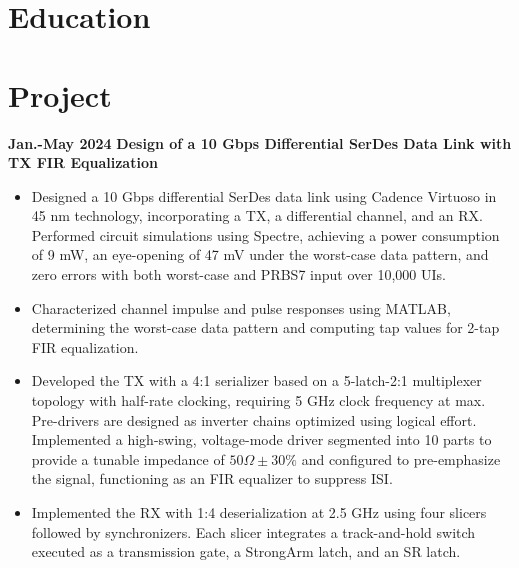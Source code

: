\documentclass[11pt,a4paper,sans]{moderncv}
\begin{document}
\makecvtitle
\vspace{-1.5cm} 

\section{Education}

\vspace{-0.5cm} 
\section{Project}

\cventry
{\textnormal{\textbf{Jan.-May 2024}}}
{\textnormal{\textbf{Design of a 10 Gbps Differential SerDes Data Link with TX FIR Equalization}}}
{}{}{}
{
    \begin{itemize}
        \item Designed a 10 Gbps differential SerDes data link using Cadence Virtuoso in 45 nm technology, incorporating a TX, a differential channel, and an RX. Performed circuit simulations using Spectre, achieving a power consumption of 9 mW, an eye-opening of 47 mV under the worst-case data pattern, and zero errors with both worst-case and PRBS7 input over 10,000 UIs.
        \item Characterized channel impulse and pulse responses using MATLAB, determining the worst-case data pattern and computing tap values for 2-tap FIR equalization.
        \item Developed the TX with a 4:1 serializer based on a 5-latch-2:1 multiplexer topology with half-rate clocking, requiring 5 GHz clock frequency at max. Pre-drivers are designed as inverter chains optimized using logical effort. Implemented a high-swing, voltage-mode driver segmented into 10 parts to provide a tunable impedance of $50 \Omega \pm 30\%$ and configured to pre-emphasize the signal, functioning as an FIR equalizer to suppress ISI.
        \item Implemented the RX with 1:4 deserialization at 2.5 GHz using four slicers followed by synchronizers. Each slicer integrates a track-and-hold switch executed as a transmission gate, a StrongArm latch, and an SR latch.
    \end{itemize}
}
\end{document}
